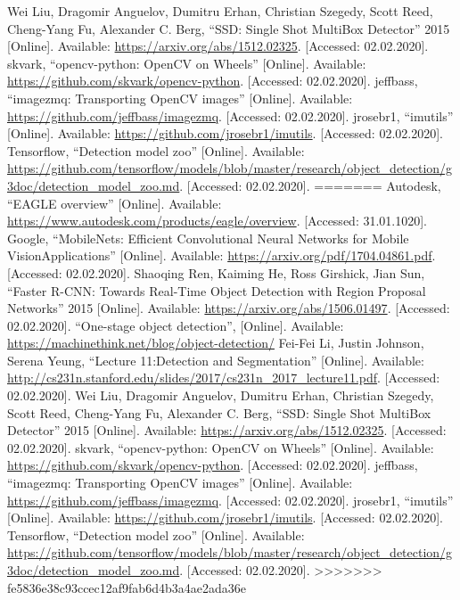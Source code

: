 \begin{flushleft}
\begin{thebibliography}{99}
 Wei Liu, Dragomir Anguelov, Dumitru Erhan, Christian Szegedy, Scott Reed, Cheng-Yang Fu, Alexander C. Berg, ``SSD: Single Shot MultiBox Detector'' 2015 [Online]. Available: \url{https://arxiv.org/abs/1512.02325}. [Accessed: 02.02.2020].
 skvark, ``opencv-python: OpenCV on Wheels'' [Online]. Available: \url{https://github.com/skvark/opencv-python}. [Accessed: 02.02.2020].
 jeffbass, ``imagezmq: Transporting OpenCV images'' [Online]. Available: \url{https://github.com/jeffbass/imagezmq}. [Accessed: 02.02.2020].
 jrosebr1, ``imutils'' [Online]. Available: \url{https://github.com/jrosebr1/imutils}. [Accessed: 02.02.2020].
 Tensorflow, ``Detection model zoo'' [Online]. Available: \url{https://github.com/tensorflow/models/blob/master/research/object_detection/g3doc/detection_model_zoo.md}. [Accessed: 02.02.2020].
=======
 Autodesk, ``EAGLE overview'' [Online]. Available: \url{https://www.autodesk.com/products/eagle/overview}. [Accessed: 31.01.1020]. 
 Google, ``MobileNets: Efficient Convolutional Neural Networks for Mobile VisionApplications'' [Online]. Available: \url{https://arxiv.org/pdf/1704.04861.pdf}. [Accessed: 02.02.2020].
 Shaoqing Ren, Kaiming He, Ross Girshick, Jian Sun, ``Faster R-CNN: Towards Real-Time Object Detection with Region Proposal Networks'' 2015 [Online]. Available: \url{https://arxiv.org/abs/1506.01497}. [Accessed: 02.02.2020].
 ``One-stage object detection'', [Online]. Available: \url{https://machinethink.net/blog/object-detection/}
 Fei-Fei Li, Justin Johnson, Serena Yeung, ``Lecture 11:Detection and Segmentation'' [Online]. Available: \url{http://cs231n.stanford.edu/slides/2017/cs231n_2017_lecture11.pdf}. [Accessed: 02.02.2020].
 Wei Liu, Dragomir Anguelov, Dumitru Erhan, Christian Szegedy, Scott Reed, Cheng-Yang Fu, Alexander C. Berg, ``SSD: Single Shot MultiBox Detector'' 2015 [Online]. Available: \url{https://arxiv.org/abs/1512.02325}. [Accessed: 02.02.2020].
 skvark, ``opencv-python: OpenCV on Wheels'' [Online]. Available: \url{https://github.com/skvark/opencv-python}. [Accessed: 02.02.2020].
 jeffbass, ``imagezmq: Transporting OpenCV images'' [Online]. Available: \url{https://github.com/jeffbass/imagezmq}. [Accessed: 02.02.2020].
 jrosebr1, ``imutils'' [Online]. Available: \url{https://github.com/jrosebr1/imutils}. [Accessed: 02.02.2020].
 Tensorflow, ``Detection model zoo'' [Online]. Available: \url{https://github.com/tensorflow/models/blob/master/research/object_detection/g3doc/detection_model_zoo.md}. [Accessed: 02.02.2020].
>>>>>>> fe5836e38c93ccec12af9fab6d4b3a4ae2ada36e
\end{thebibliography} 

\end{flushleft}

